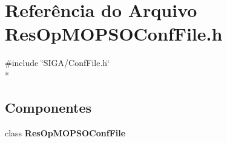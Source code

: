 \section{Referência do Arquivo Res\+Op\+M\+O\+P\+S\+O\+Conf\+File.\+h}
\label{_2_tecniques_2_m_o_p_s_o_2_res_op_m_o_p_s_o_conf_file_8h}
{\ttfamily \#include \char`\"{}S\+I\+G\+A/\+Conf\+File.\+h\char`\"{}}\\*
\subsection*{Componentes}
\begin{DoxyCompactItemize}
\item 
class {\bf Res\+Op\+M\+O\+P\+S\+O\+Conf\+File}
\end{DoxyCompactItemize}
